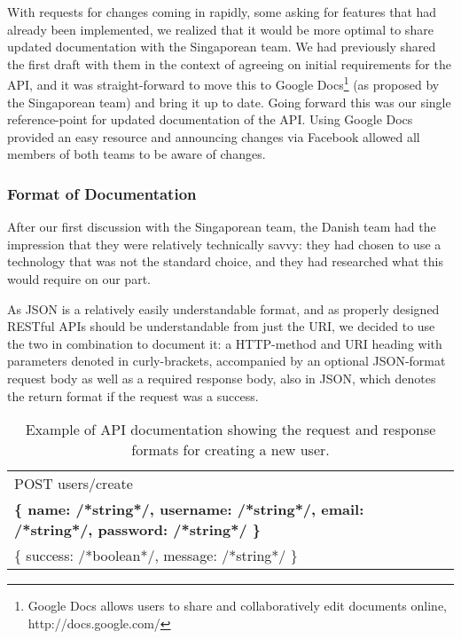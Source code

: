 With requests for changes coming in rapidly, some asking for features that had already been implemented, we
realized that it would be more optimal to share updated documentation with the Singaporean team. We had previously
shared the first draft with them in the context of agreeing on initial requirements for the API, and it was
straight-forward to move this to Google Docs\footnote{Google Docs allows users to share and collaboratively edit
documents online, http://docs.google.com/} (as proposed by the Singaporean team) and bring it up to date. Going
forward this was our single reference-point for updated documentation of the API. Using Google Docs provided an easy
resource and announcing changes via Facebook allowed all members of both teams to be aware of changes.

\subsubsection{Format of Documentation}

After our first discussion with the Singaporean team, the Danish team had the impression that they were
relatively technically savvy: they had chosen to use a technology that was not the standard choice, and
they had researched what this would require on our part.

As JSON is a relatively easily understandable format, and as properly designed RESTful APIs should be
understandable from just the URI, we decided to use the two in combination to document it: a HTTP-method
and URI heading with parameters denoted in curly-brackets, accompanied by an optional JSON-format request
body as well as a required response body, also in JSON, which denotes the return format if the request was
a success.

\begin{table}[hbt]
    \begin{tabular}{ | l | }
        \hline
        POST users/create \\
        \textbf{\{ name: /*string*/, username: /*string*/, email: /*string*/, password: /*string*/ \}} \\
        \{ success: /*boolean*/, message: /*string*/ \} \\
        \hline
    \end{tabular}
    \caption{Example of API documentation showing the request and response formats for creating a new user.}
\end{table}

